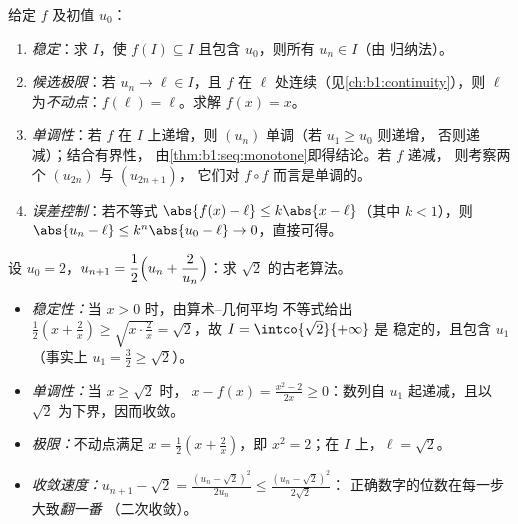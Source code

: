 \begin{method}[研究 $u_{n+1} = f(u_n)$]\label{met:b1:seq:recurrent}
给定 $f$ 及初值 $u_0$：
\begin{enumerate}
  \item \emph{稳定}：求 $I$，使 $f(I)
        \subseteq I$ 且包含 $u_0$，则所有 $u_n \in I$（由
        归纳法）。
  \item \emph{候选极限}：若 $u_n \to \ell \in I$，且 $f$
        在 $\ell$ 处连续（见\cref{ch:b1:continuity}），则 $\ell$
        为\emph{不动点}：$f(\ell) = \ell$。求解 $f(x) = x$。
  \item \emph{单调性}：若 $f$ 在 $I$ 上递增，则
        $(u_n)$ 单调（若 $u_1 \geq u_0$ 则递增，
        否则递减）；结合有界性，
        由\cref{thm:b1:seq:monotone}即得结论。若 $f$ 递减，
        则考察两个 $(u_{2n})$ 与 $(u_{2n+1})$，
        它们对 $f \circ f$ 而言是单调的。
  \item \emph{误差控制}：若不等式 $\abs{f(x) - \ell} \leq
        k\abs{x - \ell}$（其中 $k < 1$），则 $\abs{u_n - \ell} \leq
        k^n \abs{u_0 - \ell} \to 0$，直接可得。
\end{enumerate}
\end{method}

\begin{example}[海伦方法]\label{ex:b1:seq:heron}
设 $u_0 = 2$，$u_{n+1} = \dfrac12\Bigl(u_n +
\dfrac{2}{u_n}\Bigr)$：求
$\sqrt 2$ 的古老算法。
\begin{itemize}
  \item \emph{稳定性：}当 $x > 0$ 时，由算术--几何平均
        不等式给出 $\frac12(x + \frac2x) \geq \sqrt{x \cdot
        \frac 2x} = \sqrt 2$，故 $I = \intco{\sqrt 2}{+\infty}$ 是
        稳定的，且包含 $u_1$（事实上 $u_1 = \frac32 \geq
        \sqrt 2$）。
  \item \emph{单调性：}当 $x \geq \sqrt 2$ 时，$\;x - f(x) =
        \frac{x^2 - 2}{2x} \geq 0$：数列自
        $u_1$ 起递减，且以 $\sqrt 2$ 为下界，因而收敛。
  \item \emph{极限：}不动点满足 $x = \frac12(x +
        \frac2x)$，即 $x^2 = 2$；在 $I$ 上，$\ell = \sqrt 2$。
  \item \emph{收敛速度：}$u_{n+1} - \sqrt 2 = \frac{(u_n -
        \sqrt2)^2}{2u_n} \leq \frac{(u_n - \sqrt 2)^2}{2\sqrt 2}$：
        正确数字的位数在每一步大致\emph{翻一番}
        （二次收敛）。
\end{itemize}
\end{example}

